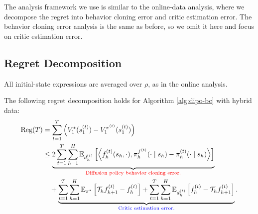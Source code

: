 The analysis framework we use is similar to the online-data analysis, where we decompose the regret into behavior cloning error and critic estimation error.
The behavior cloning error analysis is the same as before, so we omit it here and focus on critic estimation error.
\subsection{Regret Decomposition}

All initial-state expressions are averaged over $\rho$, as in the online analysis.

\begin{lem}
    The following regret decomposition holds for Algorithm \ref{alg:dipo-bc} with hybrid data:
    \begin{align*}
        \text{Reg}(T) &= \sum_{t=1}^T\left(V_1^{*}(s_1^{(t)})-V_1^{\pi^{(t)}}(s_1^{(t)})\right) \\
        &\leq \underbrace{2\sum_{t=1}^T\sum_{h=1}^H \mathbb{E}_{d_h^{(t)}}\left[\left\langle f_h^{(t)}(s_h, \cdot), \pi_h^{f^{(t)}}(\cdot \mid s_h)-\pi_h^{(t)}(\cdot \mid s_h)\right\rangle\right]}_{\textcolor{red}{\text{Diffusion policy behavior cloning error.}}} \\
        &\quad+ \underbrace{\sum_{t=1}^T \sum_{h=1}^H \mathbb{E}_{\pi^*}\left[\mathcal{T}_h f_{h+1}^{(t)}- f_h^{(t)}\right] + \sum_{t=1}^T \sum_{h=1}^H \mathbb{E}_{d_h^{(t)}}\left[f_h^{(t)}-{\mathcal{T}}_h f_{h+1}^{(t)}\right]}_{\textcolor{blue}{\text{Critic estimation error.}}} .
    \end{align*}
    \label{lem:regret-decomp-dipo-hybrid}
\end{lem}


